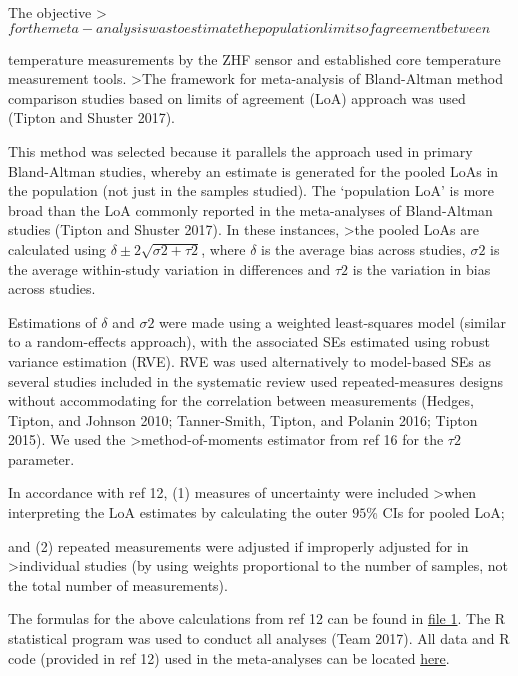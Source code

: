 \documentclass[smallextended]{svjour3}       %
\begin{document}
The objective
\textgreater{}\(for the meta-analysis was to estimate the population limits of agreement between\)

temperature measurements by the ZHF sensor and established core
temperature measurement tools. \textgreater{}The framework for
meta-analysis of Bland-Altman method comparison studies based on limits
of agreement (LoA) approach was used (Tipton and Shuster 2017).

This method was selected because it parallels the approach used in
primary Bland-Altman studies, whereby an estimate is generated for the
pooled LoAs in the population (not just in the samples studied). The
`population LoA' is more broad than the LoA commonly reported in the
meta-analyses of Bland-Altman studies (Tipton and Shuster 2017). In
these instances, \textgreater{}the pooled LoAs are calculated using
\(\delta\pm2\sqrt{\sigma2+\tau2}\), where \(\delta\) is the average bias
across studies, \(\sigma2\) is the average within-study variation in
differences and \(\tau2\) is the variation in bias across studies.

Estimations of \(\delta\) and \(\sigma2\) were made using a weighted
least-squares model (similar to a random-effects approach), with the
associated SEs estimated using robust variance estimation (RVE). RVE was
used alternatively to model-based SEs as several studies included in the
systematic review used repeated-measures designs without accommodating
for the correlation between measurements (Hedges, Tipton, and Johnson
2010; Tanner-Smith, Tipton, and Polanin 2016; Tipton 2015). We used the
\textgreater{}method-of-moments estimator from ref 16 for the \(\tau2\)
parameter.

In accordance with ref 12, (1) measures of uncertainty were included
\textgreater{}when interpreting the LoA estimates by calculating the
outer \(95\%\) CIs for pooled LoA;

and (2) repeated measurements were adjusted if improperly adjusted for
in \textgreater{}individual studies (by using weights proportional to
the number of samples, not the total number of measurements).

The formulas for the above calculations from ref 12 can be found in
\href{}{file 1}. The R statistical program was used to conduct all
analyses (Team 2017). All data and R code (provided in ref 12) used in
the meta-analyses can be located \href{https://doi.org}{here}.
\end{document}
